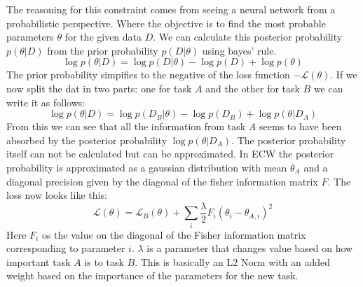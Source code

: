 \documentclass[a4paper]{article}
\begin{document}
The reasoning for this constraint comes from seeing a neural network from a probabilistic perspective. Where the objective is to find the most probable parameters $\theta$ for the given data $D$. We can calculate this posterior probability $p(\theta|D)$ from the prior probability $p(D|\theta)$ using bayes' rule.
\begin{equation}
\log p(\theta|D) = \log p(D|\theta) - \log p(D) + \log p(\theta)
\end{equation}
The prior probability simpifies to the negative of the loss function $-\mathcal{L} (\theta)$. If we now split the dat in two parts: one for task $A$ and the other for task $B$ we can write it as follows:
\begin{equation}
\log p(\theta|D) = \log p(D_B|\theta) - \log p(D_B) + \log p(\theta|D_A)
\end{equation}
From this we can see that all the information from task $A$ seems to have been absorbed by the posterior probability $\log p(\theta|D_A)$. The posterior probability itself can not be calculated but can be approximated. In ECW the posterior probability is approximated as a gaussian distribution with mean $\theta_A$ and a diagonal precision given by the diagonal of the fisher information matrix $F$. The loss now looks like this:
\begin{equation}
\mathcal{L} (\theta) = \mathcal{L}_B (\theta) + \sum\limits_{i} \dfrac{\lambda}{2} F_i(\theta_i - \theta_{A,i})^2
\end{equation}
Here $F_i$ os the value on the diagonal of the Fisher information matrix corresponding to parameter $i$. $\lambda$ is a parameter that changes value based on how important task $A$ is to task $B$. This is basically an L2 Norm with an added weight based on the importance of the parameters for the new task. 
\end{document}
